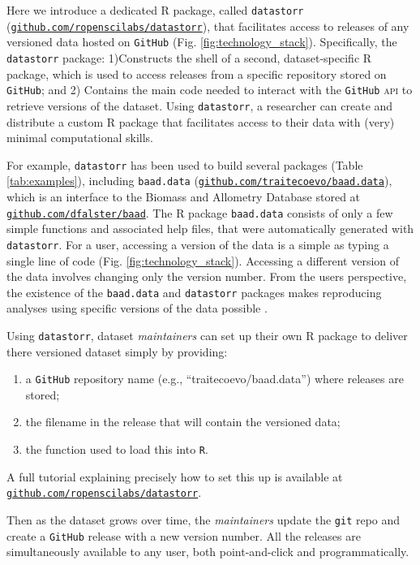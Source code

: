 \documentclass[english]{article}
\newcommand{\smurl}[1]{{\footnotesize\href{https://#1}{\nolinkurl{#1}}}}
\begin{document}
Here we introduce a dedicated \textsc{R} package, called \texttt{datastorr} (\smurl{github.com/ropenscilabs/datastorr}), that facilitates access to releases of any versioned data hosted on \texttt{GitHub} (Fig. \ref{fig:technology_stack}). Specifically, the \texttt{datastorr} package: 1)Constructs the shell of a second, dataset-specific \textsc{R} package, which is used to access releases from a specific repository stored on \texttt{GitHub}; and 2) Contains the main code needed to interact with the \texttt{GitHub} \textsc{api} to retrieve versions of the dataset. 
Using \texttt{datastorr}, a researcher can create and distribute a custom \textsc{R} package that facilitates access to their data with (very) minimal computational skills.

For example, \texttt{datastorr} has been used to build several packages (Table \ref{tab:examples}), including \texttt{baad.data} (\smurl{github.com/traitecoevo/baad.data}), which is an interface to the Biomass and Allometry Database \cite{Falster-2015} stored at \smurl{github.com/dfalster/baad}. The R package \texttt{baad.data} consists of only a few simple functions and associated help files, that were automatically generated with \texttt{datastorr}. For a user, accessing a version of the data is a simple as typing a single line of code (Fig. \ref{fig:technology_stack}). Accessing a different version of the data involves changing only the version number. From the users perspective, the existence of the \texttt{baad.data} and \texttt{datastorr} packages makes reproducing analyses using specific versions of the data possible \cite{Duursma-2016,Falster-2016}.

Using \texttt{datastorr}, dataset \emph{maintainers} can set up their own R package to deliver there versioned dataset simply by providing:
\begin{enumerate}
  \item a \texttt{GitHub} repository name (e.g., ``traitecoevo/baad.data'') where releases are stored;
  \item the filename in the release that will contain the versioned data;
  \item the function used to load this into \texttt{R}.
\end{enumerate}
A full tutorial explaining precisely how to set this up is available at \smurl{github.com/ropenscilabs/datastorr}.

Then as the dataset grows over time, the \emph{maintainers} update the \texttt{git} repo and create a \texttt{GitHub} release with a new version number. All the releases are simultaneously available to any user, both point-and-click and programmatically.
\end{document}
